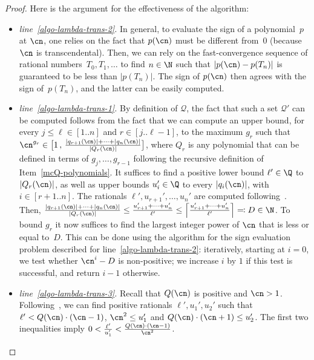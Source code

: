 \begin{proof}
    Here is the argument for the effectiveness of the algorithm:
    \begin{itemize}
        \item \textit{line~\ref{algo-lambda-trans-2}.} 
        In general, to evaluate the sign of a polynomial~$p$ at $\cn$, one
        relies on the fact that $p(\cn)$ must be different from~$0$ (because
        $\cn$ is transcendental). Then, we can rely on the fast-convergence
        sequence of rational numbers~$T_0,T_1,\dots$ to find $n \in \N$ such that
        $|p(\cn) - p(T_{n})|$ is guaranteed to be less than $|p(T_{n})|$. The
        sign of $p(\cn)$ then agrees with the sign of~$p(T_{n})$, and the latter
        can be easily computed.
        \item \textit{line~\ref{algo-lambda-trans-1}.} By definition of $\mathcal{Q}$, the fact that such a set $\mathcal{Q}'$ can be computed follows from the fact that we can compute an upper bound, for every $j \leq \ell \in [1..n]$ and $r \in [j..\ell-1]$, to the maximum $g_r$ such that $\cn^{g_r} \in \big[1\,,\,\frac{\abs{q_{r+1}(\cn)}+\cdots+\abs{q_n(\cn)}}{\abs{Q_r(\cn)}}\big]$, where $Q_r$ is any polynomial that can be defined in terms of $g_{j},\dots,g_{r-1}$ following the recursive definition of Item~\ref{mcQ-polynomials}.
        It suffices to find a positive lower bound $\ell' \in \Q$ to $\abs{Q_r(\cn)}$, 
        as well as upper bounds $u_i' \in \Q$ to every $\abs{q_i(\cn)}$, with $i \in [r+1..n]$. The rationals $\ell',u_{r+1}',\dots,u_n'$ are computed following~. Then, 
        $\frac{\abs{q_{r+1}(\cn)}+\cdots+\abs{q_n(\cn)}}{\abs{Q_r(\cn)}} \leq \frac{u_{r+1}'+\cdots+u_{n}'}{\ell'} \leq \ceil{\frac{u_{r+1}'+\cdots+u_{n}'}{\ell'}} \eqqcolon D \in \N$.
        To bound $g_r$ it now suffices to find the largest integer power of $\cn$ that is less or equal to~$D$. This can be done using the algorithm for the sign evaluation problem described for line~\ref{algo-lambda-trans-2}: iteratively, starting at $i = 0$, we test whether $\cn^i - D$ is non-positive; we increase $i$ by $1$ if this test is successful, and return $i-1$ otherwise. 
        \item \textit{line~\ref{algo-lambda-trans-3}.} 
        Recall that $Q(\cn)$ is positive and $\cn > 1$.
        Following~, we can find positive rationals $\ell',u_1',u_2'$ 
        such that $\ell' < Q(\cn) \cdot (\cn-1)$, $\cn^2 \leq u_1'$ 
        and $Q(\cn) \cdot (\cn+1) \leq u_2'$.
        The first two inequalities imply $0 < \frac{\ell'}{u_1'} < \frac{Q(\cn) \cdot (\cn-1)}{\cn^2}$.

\end{itemize}
\end{proof}
